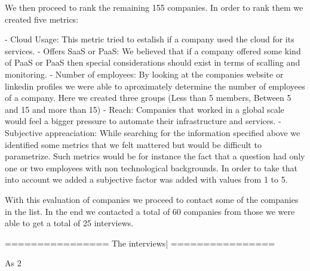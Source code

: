 We then proceed to rank the remaining 155 companies. In order to rank them we created five metrics:
	
	- Cloud Usage: This metric tried to estalish if a company used the cloud for its services.
	- Offers SaaS or PaaS: We believed that if a company offered some kind of PaaS or PaaS then special considerations should exist in terms of scalling and monitoring.
	- Number of employees: By looking at the companies website or linkedin profiles we were able to aproximately determine the number of employees of a company. Here we created three groups (Less than 5 members, Between 5 and 15 and more than 15)
	- Reach: Companies that worked in a global scale would feel a bigger pressure to automate their infrastructure and services.
	- Subjective appreaciation: While searching for the information specified above we identified some metrics that we felt mattered but would be difficult to parametrize. Such metrics would be for instance the fact that a question had only one or two employees with non technological backgrounds. In order to take that into account we added a subjective factor was added with values from 1 to 5.


With this evaluation of companies we proceed to contact some of the companies in the list. In the end we contacted a total of 60 companies from those we were able to get a total of 25 interviews.

================
The interviews|
================

As 2















